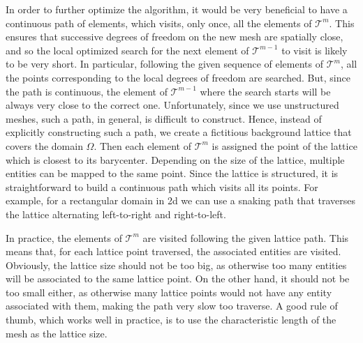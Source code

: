 In order to further optimize the algorithm, it would be very beneficial to have
a continuous path of elements, which visits, only once, all the elements of
$\mathcal{T}^m$. This ensures that successive degrees of freedom on the new
mesh are spatially close, and so the local optimized search for the next
element of $\mathcal{T}^{m-1}$ to visit is likely to be very short. In
particular, following the given sequence of elements of $\mathcal{T}^m$,
all the points corresponding to the local degrees of freedom are searched.
But, since the path is continuous, the element of $\mathcal{T}^{m-1}$ where the
search starts will be always very close to the correct one. Unfortunately,
since we use unstructured meshes, such a path, in general, is difficult to
construct. Hence, instead of explicitly constructing such a path, we create a
fictitious background lattice that covers the domain $\Omega$. Then each element
of $\mathcal{T}^m$ is assigned the point of the lattice which is closest to its
barycenter. Depending on the size of the lattice, multiple entities can be
mapped to the same point. Since the lattice is structured, it is straightforward
to build a continuous path which visits all its points. For example, for a
rectangular domain in 2d we can use a snaking path that traverses the lattice
alternating left-to-right and right-to-left.

In practice, the elements of $\mathcal{T}^m$ are visited following the given
lattice path. This means that, for each lattice point traversed, the associated
entities are visited. Obviously, the lattice size should not be too big, as
otherwise too many entities will be associated to the same lattice point. On the
other hand, it should not be too small either, as otherwise many lattice points
would not have any entity associated with them, making the path very slow too
traverse. A good rule of thumb, which works well in practice, is to use the
characteristic length of the mesh as the lattice size.